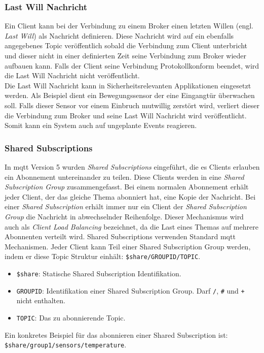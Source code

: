 \subsubsection{Last Will Nachricht}
Ein Client kann bei der Verbindung zu einem Broker einen letzten Willen (engl. \textit{Last Will}) als Nachricht definieren. Diese Nachricht wird auf ein ebenfalls angegebenes Topic veröffentlich sobald die Verbindung zum Client unterbricht und dieser nicht in einer definierten Zeit seine Verbindung zum Broker wieder aufbauen kann. Falls der Client seine Verbindung Protokollkonform beendet, wird die Last Will Nachricht nicht veröffentlicht.
\cite{soniSURVEYMQTTPROTOCOL}\\
Die Last Will Nachricht kann in Sicherheitsrelevanten Applikationen eingesetzt werden. Als Beispiel dient ein Bewegungssensor der eine Eingangtür überwachen soll. Falls dieser Sensor vor einem Einbruch mutwillig zerstört wird, verliert dieser die Verbindung zum Broker und seine Last Will Nachricht wird veröffentlicht. Somit kann ein System auch auf ungeplante Events reagieren.

\subsubsection{Shared Subscriptions}
In \ac{mqtt} Version 5 wurden \textit{Shared Subscriptions} eingeführt, die es Clients erlauben ein Abonnement untereinander zu teilen. Diese Clients werden in eine \textit{Shared Subscription Group} zusammengefasst. Bei einem normalen Abonnement erhält jeder Client, der das gleiche Thema abonniert hat, eine Kopie der Nachricht. Bei einer \textit{Shared Subscription} erhält immer nur ein Client der \textit{Shared Subscription Group} die Nachricht in abwechselnder Reihenfolge. Dieser Mechanismus wird auch als \textit{Client Load Balancing} bezeichnet, da die Last eines Themas auf mehrere Abonnenten verteilt wird.\cite{raschbichlerMQTTHowNew}
Shared Subscriptions verwenden Standard \ac{mqtt} Mechanismen. Jeder Client kann Teil einer Shared Subscription Group werden, indem er diese Topic Struktur einhält: \verb|$share/GROUPID/TOPIC|.
\begin{itemize}
    \item \verb|$share|: Statische Shared Subscription Identifikation.
    \item \verb|GROUPID|: Identifikation einer Shared Subscription Group. Darf \verb|/|, \verb|#| und \verb|+| nicht enthalten.
    \item \verb|TOPIC|: Das zu abonnierende Topic.
\end{itemize}
Ein konkretes Beispiel für das abonnieren einer Shared Subscription ist: \verb|$share/group1/sensors/temperature|.

